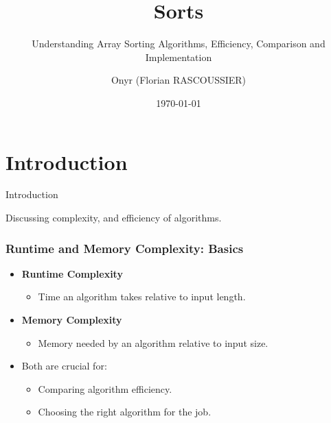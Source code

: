 \documentclass[compress,12pt,bookmark]{beamer}
\title{Sorts}
\subtitle{Understanding Array Sorting Algorithms, Efficiency, Comparison and Implementation}
\date{\today}
\author{Onyr (Florian RASCOUSSIER)}
\institute{INSA Lyon \& IMT Atlantique}
\begin{document}
\frame[plain]{\titlepage}

\section{Introduction}

\begin{frame}
    \centering
    \Huge
    Introduction

    \normalsize
    Discussing complexity, and efficiency of algorithms.
    \vfill
\end{frame}

\begin{frame}
    \frametitle{Runtime and Memory Complexity: Basics}

    \begin{itemize}
          \item \textbf{Runtime Complexity}
                \begin{itemize}
                      \item Time an algorithm takes relative to input length.
                \end{itemize}
          \item \textbf{Memory Complexity}
                \begin{itemize}
                      \item Memory needed by an algorithm relative to input size.
                \end{itemize}
          \item Both are crucial for:
                \begin{itemize}
                      \item Comparing algorithm efficiency.
                      \item Choosing the right algorithm for the job.
                \end{itemize}
    \end{itemize}
\end{frame}
\end{document}
